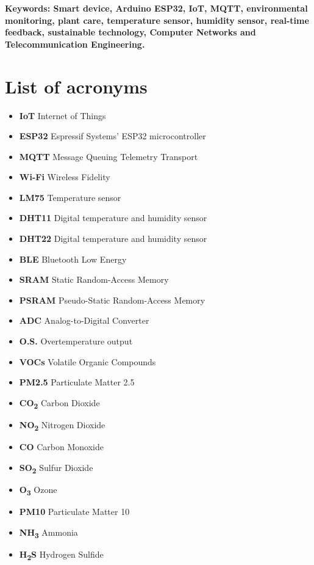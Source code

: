 \documentclass[12pt,a4paper,oneside,english]{book}
\begin{document}
\medskip
{\noindent \textbf{Keywords: Smart device, Arduino ESP32, IoT, MQTT, environmental monitoring, plant care, temperature sensor, humidity sensor, real-time feedback, sustainable technology, Computer Networks and Telecommunication Engineering.} }

\tableofcontents{}
\newpage 
\listoffigures
\newpage 
\listoftables
\newpage
{}
\chapter*{List of acronyms}
\begin{itemize}
\item \textbf{IoT} Internet of Things
\item \textbf{ESP32} Espressif Systems' ESP32 microcontroller
\item \textbf{MQTT} Message Queuing Telemetry Transport
\item \textbf{Wi-Fi} Wireless Fidelity
\item \textbf{LM75} Temperature sensor
\item \textbf{DHT11} Digital temperature and humidity sensor
\item \textbf{DHT22} Digital temperature and humidity sensor
\item \textbf{BLE} Bluetooth Low Energy
\item \textbf{SRAM} Static Random-Access Memory
\item \textbf{PSRAM} Pseudo-Static Random-Access Memory
\item \textbf{ADC} Analog-to-Digital Converter
\item \textbf{O.S.} Overtemperature output
\item \textbf{VOCs} Volatile Organic Compounds
\item \textbf{PM2.5} Particulate Matter 2.5
\item \textbf{CO\textsubscript{2}} Carbon Dioxide
\item \textbf{NO\textsubscript{2}} Nitrogen Dioxide
\item \textbf{CO} Carbon Monoxide
\item \textbf{SO\textsubscript{2}} Sulfur Dioxide
\item \textbf{O\textsubscript{3}} Ozone
\item \textbf{PM10} Particulate Matter 10
\item \textbf{NH\textsubscript{3}} Ammonia
\item \textbf{H\textsubscript{2}S} Hydrogen Sulfide

\end{itemize}
\end{document}

